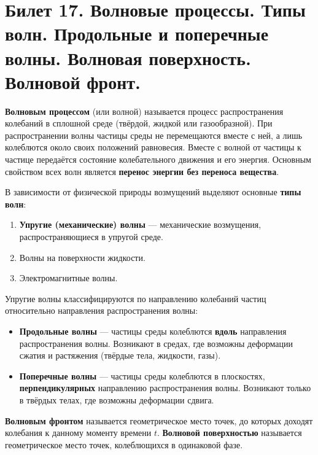 \section{Билет 17. Волновые процессы. Типы волн. Продольные и поперечные волны. Волновая поверхность. Волновой фронт.}

\begin{definition}
\textbf{Волновым процессом} (или волной) называется процесс распространения колебаний в сплошной среде (твёрдой, жидкой или газообразной). При распространении волны частицы среды не перемещаются вместе с ней, а лишь колеблются около своих положений равновесия. Вместе с волной от частицы к частице передаётся состояние колебательного движения и его энергия. Основным свойством всех волн является \textbf{перенос энергии без переноса вещества}.
\end{definition}

\begin{definition}
В зависимости от физической природы возмущений выделяют основные \textbf{типы волн}:
\begin{enumerate}
    \item \textbf{Упругие (механические) волны} --- механические возмущения, распространяющиеся в упругой среде.
    \item Волны на поверхности жидкости.
    \item Электромагнитные волны.
\end{enumerate}
\end{definition}

\begin{definition}
Упругие волны классифицируются по направлению колебаний частиц относительно направления распространения волны:
\begin{itemize}
    \item \textbf{Продольные волны} --- частицы среды колеблются \textbf{вдоль} направления распространения волны. Возникают в средах, где возможны деформации сжатия и растяжения (твёрдые тела, жидкости, газы).
    \item \textbf{Поперечные волны} --- частицы среды колеблются в плоскостях, \textbf{перпендикулярных} направлению распространения волны. Возникают только в твёрдых телах, где возможны деформации сдвига.
\end{itemize}
\end{definition}

\begin{definition}
\textbf{Волновым фронтом} называется геометрическое место точек, до которых доходят колебания к данному моменту времени $t$.
\textbf{Волновой поверхностью} называется геометрическое место точек, колеблющихся в одинаковой фазе.
\end{definition}

